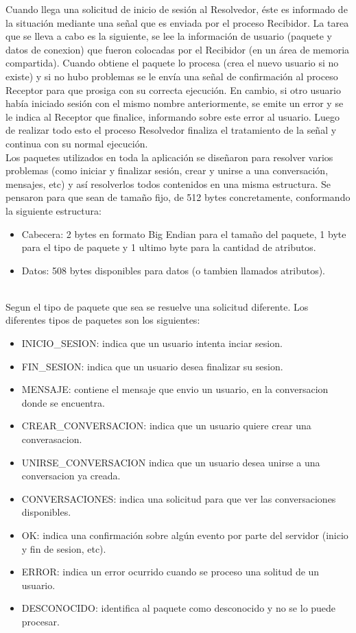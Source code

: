 \documentclass[a4paper,12pt,titlepage]{article}
\begin{document}
Cuando llega una solicitud de inicio de sesión al Resolvedor, éste es informado de la situación mediante una señal que es enviada por el proceso 
Recibidor. La tarea que se lleva a cabo es la siguiente, se lee la información de usuario (paquete y datos de conexion) que fueron colocadas por 
el Recibidor (en un área de memoria compartida). Cuando obtiene el paquete lo procesa (crea el nuevo usuario si no existe) y si no hubo problemas 
se le envía una señal de confirmación al proceso Receptor para que prosiga con su correcta ejecución. En cambio, si otro usuario había iniciado 
sesión con el mismo nombre anteriormente, se emite un error y se le indica al Receptor que finalice, informando sobre este error al usuario. Luego 
de realizar todo esto el proceso Resolvedor finaliza el tratamiento de la señal y continua con su normal ejecución.\\

Los paquetes utilizados en toda la aplicación se diseñaron para resolver varios problemas (como iniciar y finalizar sesión, crear y unirse a una 
conversación, mensajes, etc) y así resolverlos todos contenidos en una misma estructura.
Se pensaron para que sean de tamaño fijo, de 512 bytes concretamente, conformando la siguiente estructura:

\begin{itemize}
\item Cabecera: 2 bytes en formato Big Endian para el tamaño del paquete, 1 byte para el tipo de paquete y 1 ultimo byte para la cantidad de atributos.
\item Datos: 508 bytes disponibles para datos (o tambien llamados atributos).
\end{itemize}\\

Segun el tipo de paquete que sea se resuelve una solicitud diferente. Los diferentes tipos de paquetes son los siguientes:
\begin{itemize}
\item INICIO\_SESION: indica que un usuario intenta inciar sesion.
\item FIN\_SESION: indica que un usuario desea finalizar su sesion.
\item MENSAJE: contiene el mensaje que envio un usuario, en la conversacion donde se encuentra.
\item CREAR\_CONVERSACION: indica que un usuario quiere crear una converasacion.
\item UNIRSE\_CONVERSACION indica que un usuario desea unirse a una conversacion ya creada.
\item CONVERSACIONES: indica una solicitud para que ver las conversaciones disponibles.
\item OK: indica una confirmación sobre algún evento por parte del servidor (inicio y fin de sesion, etc).
\item ERROR: indica un error ocurrido cuando se proceso una solitud de un usuario.
\item DESCONOCIDO: identifica al paquete como desconocido y no se lo puede procesar.

\end{itemize}\\
\end{document}
